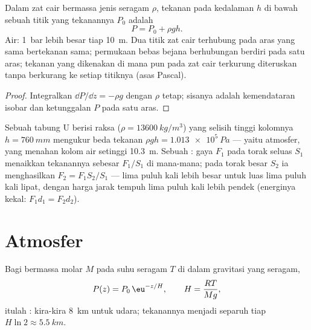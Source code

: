\begin{corollary}\label{cor:b1:fluid-statics:incompressible}
Dalam zat cair bermassa jenis seragam $\rho$, tekanan pada kedalaman $h$ di bawah
sebuah titik yang tekanannya $P_0$ adalah
\[
P = P_0 + \rho gh .
\]
Air: \qty{1}{bar} lebih besar tiap \qty{10}{m}. Dua titik zat cair terhubung
pada aras yang sama bertekanan sama; permukaan bebas
bejana berhubungan berdiri pada satu aras; tekanan yang dikenakan di mana pun
pada zat cair terkurung diteruskan tanpa berkurang ke setiap titiknya
(asas Pascal).
\end{corollary}

\begin{proof}
Integralkan $\dd P/\dd z = -\rho g$ dengan $\rho$ tetap; sisanya adalah
kemendataran isobar dan ketunggalan $P$ pada satu aras.
\end{proof}

\begin{example}\label{ex:b1:fluid-statics:manometer}
Sebuah tabung U berisi raksa ($\rho = \qty{13600}{kg/m^3}$) yang selisih tinggi kolomnya
$h = \qty{760}{mm}$ mengukur beda tekanan $\rho gh = \qty{1.013e5}{Pa}$
--- yaitu atmosfer, yang menahan kolom air setinggi \qty{10.3}{m}. Sebuah
: gaya $F_1$ pada torak seluas $S_1$ menaikkan
tekanannya sebesar $F_1/S_1$ di mana-mana; pada torak besar $S_2$ ia menghasilkan
$F_2 = F_1S_2/S_1$ --- lima puluh kali lebih besar untuk luas lima puluh kali lipat, dengan
harga jarak tempuh lima puluh kali lebih pendek (energinya kekal: $F_1d_1 = F_2d_2$).
\end{example}

\section{Atmosfer}

\begin{proposition}\label{prop:b1:fluid-statics:atmosphere}
Bagi  bermassa molar $M$ pada suhu seragam $T$ di dalam gravitasi
yang seragam,
\[
P(z) = P_0\,\eu^{-z/H}, \qquad H = \frac{RT}{Mg} ,
\]
itulah \emph{}: kira-kira \qty{8}{km} untuk udara; tekanannya menjadi separuh
tiap $H\ln2 \approx \qty{5.5}{km}$.
\end{proposition}

